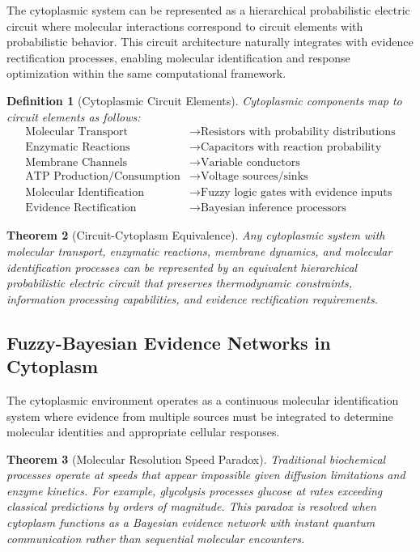 \documentclass[12pt,a4paper]{article}
\newtheorem{theorem}{Theorem}[section]
\newtheorem{definition}[theorem]{Definition}
\begin{document}
The cytoplasmic system can be represented as a hierarchical probabilistic electric circuit where molecular interactions correspond to circuit elements with probabilistic behavior. This circuit architecture naturally integrates with evidence rectification processes, enabling molecular identification and response optimization within the same computational framework.

\begin{definition}[Cytoplasmic Circuit Elements]
Cytoplasmic components map to circuit elements as follows:
\begin{align}
\text{Molecular Transport} &\rightarrow \text{Resistors with probability distributions} \\
\text{Enzymatic Reactions} &\rightarrow \text{Capacitors with reaction probability} \\
\text{Membrane Channels} &\rightarrow \text{Variable conductors} \\
\text{ATP Production/Consumption} &\rightarrow \text{Voltage sources/sinks} \\
\text{Molecular Identification} &\rightarrow \text{Fuzzy logic gates with evidence inputs} \\
\text{Evidence Rectification} &\rightarrow \text{Bayesian inference processors}
\end{align}
\end{definition}

\begin{theorem}[Circuit-Cytoplasm Equivalence]
Any cytoplasmic system with molecular transport, enzymatic reactions, membrane dynamics, and molecular identification processes can be represented by an equivalent hierarchical probabilistic electric circuit that preserves thermodynamic constraints, information processing capabilities, and evidence rectification requirements.
\end{theorem}

\subsection{Fuzzy-Bayesian Evidence Networks in Cytoplasm}

The cytoplasmic environment operates as a continuous molecular identification system where evidence from multiple sources must be integrated to determine molecular identities and appropriate cellular responses.

\begin{theorem}[Molecular Resolution Speed Paradox]
Traditional biochemical processes operate at speeds that appear impossible given diffusion limitations and enzyme kinetics. For example, glycolysis processes glucose at rates exceeding classical predictions by orders of magnitude. This paradox is resolved when cytoplasm functions as a Bayesian evidence network with instant quantum communication rather than sequential molecular encounters.
\end{theorem}
\end{document}
